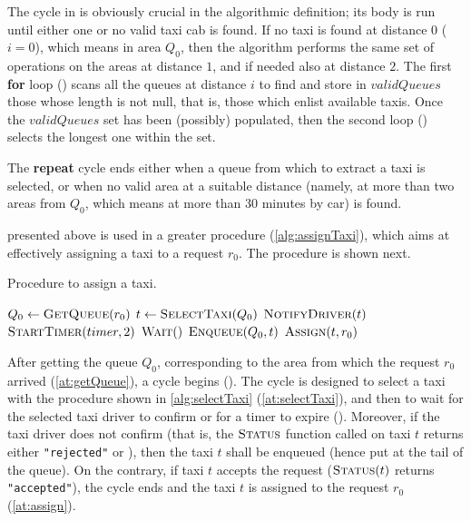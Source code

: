 The cycle in  is obviously crucial in the algorithmic definition; its body is run until either one or no valid taxi cab is found. If no taxi is found at distance $0$ ($i=0$), which means in area $Q_0$, then the algorithm performs the same set of operations on the areas at distance $1$, and if needed also at distance $2$. The first \textbf{for} loop () scans all the queues at distance $i$ to find and store in $validQueues$ those whose length is not null, that is, those which enlist available taxis. Once the $validQueues$ set has been (possibly) populated, then the second loop () selects the longest one within the set.

The \textbf{repeat} cycle ends either when a queue from which to extract a taxi is selected, or when no valid area at a suitable distance (namely, at more than two areas from $Q_0$, which means at more than \num{30} minutes by car) is found.

 presented above is used in a greater procedure (\cref{alg:assignTaxi}), which aims at effectively assigning a taxi to a request $r_0$. The procedure is shown next.




\begin{algorithm}
\caption{Procedure to assign a taxi.} \label{alg:assignTaxi}
\begin{algorithmic}[1]
	\State $Q_0 \gets \Call{GetQueue}{r_0}$ \label{at:getQueue}
	\Repeat \label{at:repeat}
		\State $t \gets \Call{\GetTaxi}{Q_0}$ \label{at:selectTaxi}
		\State $\Call{NotifyDriver}{t}$ \label{at:notifyDriver}
		\State $\Call{StartTimer}{timer,2}$ \label{at:startTimer}
			\State $\Call{Wait}{\nullfont}$
		\EndWhile \label{at:endWhile}
			\State $\Call{Enqueue}{Q_0,t}$
		\EndIf
	 \label{at:until}
	\State $\Call{Assign}{t,r_0}$ \label{at:assign}
\EndProcedure
\end{algorithmic}
\end{algorithm}


After getting the queue $Q_0$, corresponding to the area from which the request $r_0$ arrived (\cref{at:getQueue}), a cycle begins (). The cycle is designed to select a taxi with the procedure shown in \cref{alg:selectTaxi} (\cref{at:selectTaxi}), and then to wait for the selected taxi driver to confirm or for a timer to expire (). Moreover, if the taxi driver does not confirm (that is, the $\Call{Status}{}$ function called on taxi $t$ returns either \texttt{"rejected"} or \aNull), then the taxi $t$ shall be enqueued (hence put at the tail of the queue). On the contrary, if taxi $t$ accepts the request ($\Call{Status}{t}$ returns \texttt{"accepted"}), the cycle ends and the taxi $t$ is assigned to the request $r_0$ (\cref{at:assign}).


